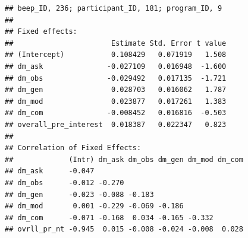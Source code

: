 \documentclass[]{msu-thesis}
\theoremstyle{definition}
\theoremstyle{definition}
\theoremstyle{definition}
\theoremstyle{remark}
\begin{document}
\begin{verbatim}
## beep_ID, 236; participant_ID, 181; program_ID, 9
## 
## Fixed effects:
##                       Estimate Std. Error t value
## (Intercept)           0.108429   0.071919   1.508
## dm_ask               -0.027109   0.016948  -1.600
## dm_obs               -0.029492   0.017135  -1.721
## dm_gen                0.028703   0.016062   1.787
## dm_mod                0.023877   0.017261   1.383
## dm_com               -0.008452   0.016816  -0.503
## overall_pre_interest  0.018387   0.022347   0.823
## 
## Correlation of Fixed Effects:
##             (Intr) dm_ask dm_obs dm_gen dm_mod dm_com
## dm_ask      -0.047                                   
## dm_obs      -0.012 -0.270                            
## dm_gen      -0.023 -0.088 -0.183                     
## dm_mod       0.001 -0.229 -0.069 -0.186              
## dm_com      -0.071 -0.168  0.034 -0.165 -0.332       
## ovrll_pr_nt -0.945  0.015 -0.008 -0.024 -0.008  0.028
\end{verbatim}
\end{document}
